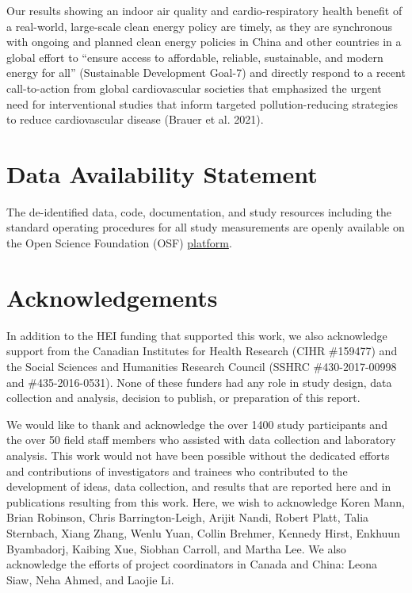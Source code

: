 \documentclass[
  letterpaper,
  DIV=11,
  numbers=noendperiod]{scrartcl}
\begin{document}
Our results showing an indoor air quality and cardio-respiratory health
benefit of a real-world, large-scale clean energy policy are timely, as
they are synchronous with ongoing and planned clean energy policies in
China and other countries in a global effort to ``ensure access to
affordable, reliable, sustainable, and modern energy for all''
(Sustainable Development Goal-7) and directly respond to a recent
call-to-action from global cardiovascular societies that emphasized the
urgent need for interventional studies that inform targeted
pollution-reducing strategies to reduce cardiovascular disease (Brauer
et al. 2021).

\hypertarget{data-availability-statement}{%
\section{Data Availability
Statement}\label{data-availability-statement}}

The de-identified data, code, documentation, and study resources
including the standard operating procedures for all study measurements
are openly available on the Open Science Foundation (OSF)
\href{https://osf.io/8twds/?view_only=c41dd3d6228240d6aad92f81371c5339}{platform}.

\hypertarget{acknowledgements}{%
\section{Acknowledgements}\label{acknowledgements}}

In addition to the HEI funding that supported this work, we also
acknowledge support from the Canadian Institutes for Health Research
(CIHR \#159477) and the Social Sciences and Humanities Research Council
(SSHRC \#430-2017-00998 and \#435-2016-0531). None of these funders had
any role in study design, data collection and analysis, decision to
publish, or preparation of this report.

We would like to thank and acknowledge the over 1400 study participants
and the over 50 field staff members who assisted with data collection
and laboratory analysis. This work would not have been possible without
the dedicated efforts and contributions of investigators and trainees
who contributed to the development of ideas, data collection, and
results that are reported here and in publications resulting from this
work. Here, we wish to acknowledge Koren Mann, Brian Robinson, Chris
Barrington-Leigh, Arijit Nandi, Robert Platt, Talia Sternbach, Xiang
Zhang, Wenlu Yuan, Collin Brehmer, Kennedy Hirst, Enkhuun Byambadorj,
Kaibing Xue, Siobhan Carroll, and Martha Lee. We also acknowledge the
efforts of project coordinators in Canada and China: Leona Siaw, Neha
Ahmed, and Laojie Li.
\end{document}
